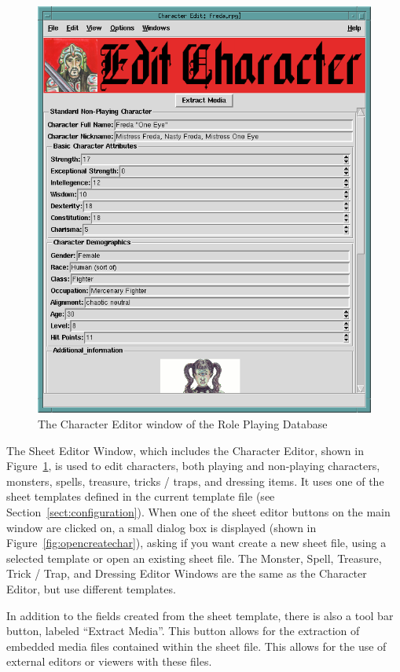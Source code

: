 \begin{figure}[hbpt] 
\begin{centering}
\includegraphics[width=5in]{CharacterEditor.png} 
\caption{The Character Editor window of the Role Playing Database} 
\label{fig:char}
\end{centering} 
\end{figure} 
The Sheet Editor Window, which includes the Character Editor, shown in
Figure~\ref{fig:char}, is used to edit characters, both playing and
non-playing characters, monsters, spells, treasure, tricks / traps, and
dressing items.  It uses one of the sheet templates defined in the
current template file (see Section~\ref{sect:configuration}).  When one
of the sheet editor buttons on the main window are clicked on, a small
dialog box is displayed (shown in Figure~\ref{fig:opencreatechar}),
asking if you want create a new sheet file, using a selected template
or open an existing sheet file. The Monster, Spell, Treasure,  Trick /
Trap, and Dressing Editor Windows are the same as the Character Editor,
but use different templates.

In addition to the fields created from the sheet template, there is also
a tool bar button, labeled ``Extract Media''.  This button allows for the
extraction of embedded media files contained within the sheet file. 
This allows for the use of external editors or viewers with these files.

